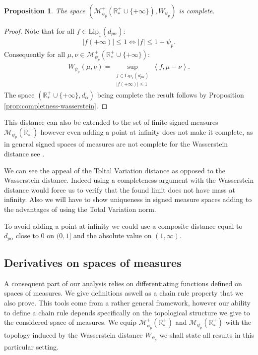 \documentclass[11pt,a4paper]{article}
\newcommand{\RRP}{\mathbb{R}^+_*}
\newcommand{\MC}{\mathcal{M}}
\newcommand{\brac}[1]{\left\langle#1\right\rangle}
\newtheorem{proposition}[theorem]{Proposition}
\begin{document}
\begin{proposition}
    The space $\left( \MC^+_{\psi_p}\left(\RRP \cup \lbrace+\infty\rbrace\right),W_{\psi_p}\right) $ is complete.
\end{proposition}
\begin{proof}
    Note that for all $f \in \text{Lip}_1(d_{p\alpha})$:
    \begin{align*}
        |f(+\infty)| \leq 1 \Leftrightarrow |f| \leq 1 + \psi_p.
    \end{align*}
    Consequently for all $\mu,\nu \in \MC^+_{\psi_p}\left(\RRP \cup \lbrace+\infty\rbrace\right)$:
    \begin{align*}
        W_{\psi_p}(\mu,\nu) = \sup_{\substack{f \in \text{Lip}_1(d_{p\alpha}) \\ |f(+\infty)| \leq 1 }} \brac{f, \mu - \nu}.
    \end{align*}
    The space $\left(\RRP \cup \lbrace+\infty\rbrace ,d_\alpha\right)$ being complete the result follows by Proposition \ref{prop:completness-wasserstein}.
\end{proof}
This distance can also be extended to the set of finite signed measures $\MC_{\psi_p}(\RRP)$ however even adding a point at infinity does not make it complete, as in general signed spaces of measures are not complete for the Wasserstein distance see \cite{piccoli2016properties}.

We can see the appeal of the Toltal Variation distance as opposed to the Wasserstein distance. Indeed using a completeness argument with the Wasserstein distance would force us to verify that the found limit does not have mass at infinity. Also we will have to show uniqueness in signed measure spaces adding to the advantages of using the Total Variation norm. 

To avoid adding a point at infinity we could use a composite distance equal to $d_{p\alpha}$ close to $0$ on $(0,1]$ and the absolute value on $(1, \infty)$. 
\subsection{Derivatives on spaces of measures}
A consequent part of our analysis relies on differentiating functions defined on spaces of measures. We give definitions aswell as a chain rule property that we also prove. This tools come from a rather general framework, however our ability to define a chain rule depends specifically on the topological structure we give to the considered space of measures. We equip $\MC^+_{\psi_p}(\RRP)$ and $\MC_{\psi_p}(\RRP)$ with the topology induced by the Wasserstein distance $W_{\psi_p}$ we shall state all results in this particular setting.
\end{document}
